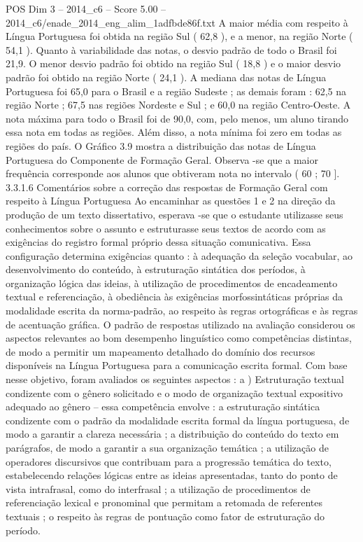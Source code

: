 \begin{textsample}{POS Dim 3 – 2014\_c6 – Score 5.00 – 2014\_c6/enade\_2014\_eng\_alim\_1adfbde86f.txt}
A maior média com respeito à Língua Portuguesa foi obtida na região Sul ( 62,8 ), e a menor, na região Norte ( 54,1 ).
Quanto à variabilidade das notas, o desvio padrão de todo o Brasil foi 21,9.
O menor desvio padrão foi obtido na região Sul ( 18,8 ) e o maior desvio padrão foi obtido na região Norte ( 24,1 ).
A mediana das notas de Língua Portuguesa foi 65,0 para o Brasil e a região Sudeste ; as demais foram : 62,5 na região Norte ; 67,5 nas regiões Nordeste e Sul ; e 60,0 na região Centro-Oeste.
A nota máxima para todo o Brasil foi de 90,0, com, pelo menos, um aluno tirando essa nota em todas as regiões.
Além disso, a nota mínima foi zero em todas as regiões do país.
O Gráfico 3.9 mostra a distribuição das notas de Língua Portuguesa do Componente de Formação Geral.
Observa -se que a maior frequência corresponde aos alunos que obtiveram nota no intervalo ( 60 ; 70 ]. 3.3.1.6 Comentários sobre a correção das respostas de Formação Geral com respeito à Língua Portuguesa Ao encaminhar as questões 1 e 2 na direção da produção de um texto dissertativo, esperava -se que o estudante utilizasse seus conhecimentos sobre o assunto e estruturasse seus textos de acordo com as exigências do registro formal próprio dessa situação comunicativa.
Essa configuração determina exigências quanto : à adequação da seleção vocabular, ao desenvolvimento do conteúdo, à estruturação sintática dos períodos, à organização lógica das ideias, à utilização de procedimentos de encadeamento textual e referenciação, à obediência às exigências morfossintáticas próprias da modalidade escrita da norma-padrão, ao respeito às regras ortográficas e às regras de acentuação gráfica.
O padrão de respostas utilizado na avaliação considerou os aspectos relevantes ao bom desempenho linguístico como competências distintas, de modo a permitir um mapeamento detalhado do domínio dos recursos disponíveis na Língua Portuguesa para a comunicação escrita formal.
Com base nesse objetivo, foram avaliados os seguintes aspectos : a ) Estruturação textual condizente com o gênero solicitado e o modo de organização textual expositivo adequado ao gênero – essa competência envolve : a estruturação sintática condizente com o padrão da modalidade escrita formal da língua portuguesa, de modo a garantir a clareza necessária ; a distribuição do conteúdo do texto em parágrafos, de modo a garantir a sua organização temática ; a utilização de operadores discursivos que contribuam para a progressão temática do texto, estabelecendo relações lógicas entre as ideias apresentadas, tanto do ponto de vista intrafrasal, como do interfrasal ; a utilização de procedimentos de referenciação lexical e pronominal que permitam a retomada de referentes textuais ; o respeito às regras de pontuação como fator de estruturação do período.

\end{textsample}
